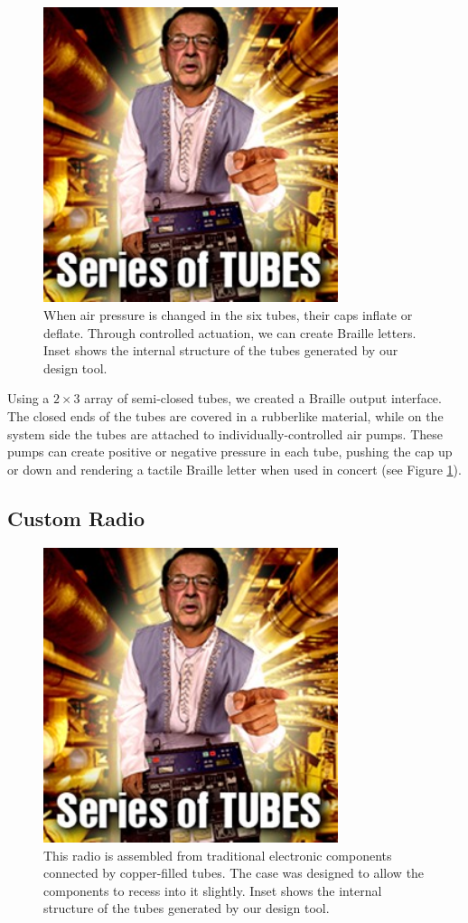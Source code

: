 \begin{figure}[h]
\centering
    \includegraphics[width=3.4in]{figures/series-of-tubes.jpg}
\caption{When air pressure is changed in the six tubes, their caps inflate or deflate. Through controlled actuation, we can create Braille letters.  Inset shows the internal structure of the tubes generated by our design tool.}
\label{fig:braille}
\end{figure}

Using a $2\times3$ array of semi-closed tubes, we created a Braille output interface.  The closed ends of the tubes are covered in a rubberlike material, while on the system side the tubes are attached to individually-controlled air pumps.  These pumps can create positive or negative pressure in each tube, pushing the cap up or down and rendering a tactile Braille letter when used in concert (see Figure \ref{fig:braille}).

\subsection{Custom Radio}

\begin{figure}[h]
\centering
    \includegraphics[width=3.4in]{figures/series-of-tubes.jpg}
\caption{This radio is assembled from traditional electronic components connected by copper-filled tubes.  The case was designed to allow the components to recess into it slightly.  Inset shows the internal structure of the tubes generated by our design tool.}
\label{fig:radio}
\end{figure}

